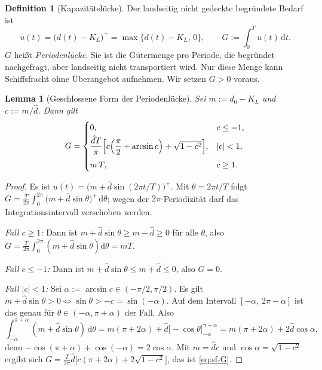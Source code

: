 \documentclass[a4paper, 12pt, twoside, openright]{report}
\providecommand{\dhat}{\hat d}      %
\providecommand{\pos}[1]{\bigl(#1\bigr)^{+}}   %
\newtheorem{lemma}[theorem]{Lemma}
\theoremstyle{definition}
\newtheorem{definition}[theorem]{Definition}
\theoremstyle{definition}
\begin{document}
\begin{definition}[Kapazitätslücke]\label{def:sf-luecke}
Der landseitig nicht gedeckte begründete Bedarf ist
\begin{equation}
  u(t)=\pos{d(t)-K_L}=\max\{d(t)-K_L,\,0\},\qquad
  G:=\int_0^T u(t)\,\mathrm{d}t .
  \label{eq:sf-luecke}
\end{equation}
$G$ heißt \emph{Periodenlücke}. Sie ist die Gütermenge pro Periode, die begründet
nachgefragt, aber landseitig nicht transportiert wird. Nur diese Menge kann
Schiffsfracht ohne Überangebot aufnehmen. Wir setzen $G>0$ voraus.
\end{definition}

\begin{lemma}[Geschlossene Form der Periodenlücke]\label{lem:sf-luecke}
Sei $m:=d_0-K_L$ und $c:=m/\dhat$. Dann gilt
\begin{equation}
  G=\begin{cases}
    0, & c\le -1,\\[2pt]
    \dfrac{\dhat T}{\pi}\Bigl[c\Bigl(\dfrac{\pi}{2}+\arcsin c\Bigr)+\sqrt{1-c^{2}}\Bigr], & |c|<1,\\[8pt]
    m\,T, & c\ge 1 .
  \end{cases}
  \label{eq:sf-G}
\end{equation}
\end{lemma}

\begin{proof}
Es ist $u(t)=\pos{m+\dhat\sin(2\pi t/T)}$. Mit $\theta=2\pi t/T$ folgt
$G=\frac{T}{2\pi}\int_0^{2\pi}\pos{m+\dhat\sin\theta}\,\mathrm{d}\theta$; wegen der
$2\pi$-Periodizität darf das Integrationsintervall verschoben werden.

\emph{Fall $c\ge1$:} Dann ist $m+\dhat\sin\theta\ge m-\dhat\ge0$ für alle $\theta$,
also $G=\frac{T}{2\pi}\int_0^{2\pi}(m+\dhat\sin\theta)\mathrm{d}\theta=mT$.

\emph{Fall $c\le-1$:} Dann ist $m+\dhat\sin\theta\le m+\dhat\le0$, also $G=0$.

\emph{Fall $|c|<1$:} Sei $\alpha:=\arcsin c\in(-\pi/2,\pi/2)$. Es gilt
$m+\dhat\sin\theta>0\iff\sin\theta>-c=\sin(-\alpha)$. Auf dem Intervall
$[-\alpha,\,2\pi-\alpha]$ ist das genau für $\theta\in(-\alpha,\pi+\alpha)$ der Fall.
Also
\[
  \int_{-\alpha}^{\pi+\alpha}(m+\dhat\sin\theta)\,\mathrm{d}\theta
  = m(\pi+2\alpha)+\dhat\bigl[-\cos\theta\bigr]_{-\alpha}^{\pi+\alpha}
  = m(\pi+2\alpha)+2\dhat\cos\alpha ,
\]
denn $-\cos(\pi+\alpha)+\cos(-\alpha)=2\cos\alpha$. Mit $m=\dhat c$ und
$\cos\alpha=\sqrt{1-c^2}$ ergibt sich
$G=\frac{T}{2\pi}\dhat\bigl[c(\pi+2\alpha)+2\sqrt{1-c^2}\bigr]$, das ist \eqref{eq:sf-G}.
\end{proof}
\end{document}
